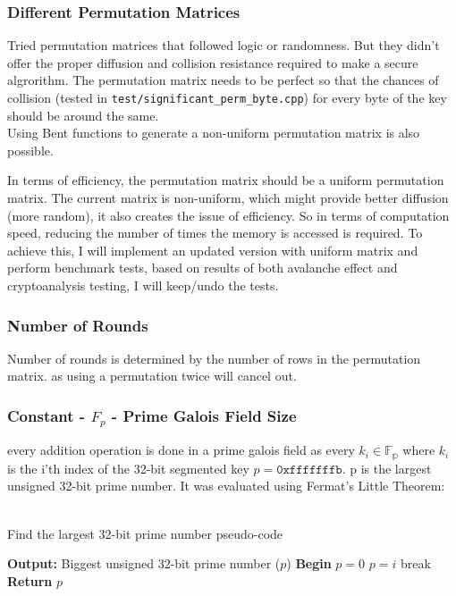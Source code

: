 \documentclass[fleqn, a4paper,12pt]{article}
\begin{document}
\subsubsection{Different Permutation Matrices}

Tried permutation matrices that followed logic or randomness. But they didn't offer the proper diffusion and collision resistance required to make a secure algrorithm. The permutation matrix needs to be perfect so that the chances of collision (tested in \texttt{test/significant\_perm\_byte.cpp}) for every byte of the key should be around the same.\\
Using Bent functions to generate a non-uniform permutation matrix is also possible.

In terms of efficiency, the permutation matrix should be a uniform permutation matrix. The current matrix is non-uniform, which might provide better diffusion (more random), it also creates the issue of efficiency. So in terms of computation speed, reducing the number of times the memory is accessed is required. To achieve this, I will implement an updated version with uniform matrix and perform benchmark tests, based on results of both avalanche effect and cryptoanalysis testing, I will keep/undo the tests.

\subsubsection{Number of Rounds}

Number of rounds is determined by the number of rows in the permutation matrix. as using a permutation twice will cancel out.

\subsubsection{Constant - $F_p$ - Prime Galois Field Size}

every addition operation is done in a prime galois field as every $k_i \in \mathbb{F_p}$ where $k_i$ is the i'th index of the 32-bit segmented key $p = \texttt{0xfffffffb}$. p is the largest unsigned 32-bit prime number. It was evaluated using Fermat's Little Theorem:\\
\\
\begin{algorithm}[H] %
\caption{Find the largest 32-bit prime number pseudo-code}
\begin{algorithmic}[1]  %
\State \textbf{Output:} Biggest unsigned 32-bit prime number ($p$)
\State \textbf{Begin}
\State $p = 0$
		\State $p = i$
		\State break
	\EndIf
\EndFor
\State \textbf{Return} $p$
\end{algorithmic}
\end{algorithm}
\end{document}
